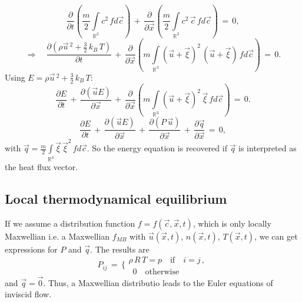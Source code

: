 \begin{equation}
  \frac{\partial{}}{\partial{t}} \left( \frac{m}{2} \int \limits_{\mathbb{R}^3} c^2 \, f d\vec c \right) \, + \, \frac{\partial{}}{\partial{\vec x}}  \left( \frac{m}{2} \int \limits_{\mathbb{R}^3} c^2 \, \vec c \, f d\vec c \right)  \, =\, 0,\nonumber
\end{equation}
\begin{equation}
  \Rightarrow \quad \frac{\partial{(\rho \vec u\,^2 + \frac{3}{2} \, k_B \, T)}}{\partial{t}}  \, + \, \frac{\partial{}}{\partial{\vec x}}  \left( m \int \limits_{\mathbb{R}^3} (\vec u + \vec \xi)^2 \,(\vec u + \vec \xi) \, f d\vec c \right)  \, =\, 0.\nonumber
\end{equation}
Using $E=\rho \vec u\,^2 + \frac{3}{2} \, k_B \, T$:
\begin{equation}
  \frac{\partial{E}}{\partial{t}}  \, + \, \frac{\partial{(\vec u E)}}{\partial{\vec x}} \, + \, \frac{\partial{}}{\partial{\vec x}}  \left( m \int \limits_{\mathbb{R}^3} (\vec u + \vec \xi)^2 \, \vec \xi \, f d\vec c \right)  \, =\, 0.\nonumber
\end{equation}
\begin{equation}
  \frac{\partial{E}}{\partial{t}}  \, + \, \frac{\partial{(\vec u E)}}{\partial{\vec x}} \, + \,  \frac{\partial{(P\, \vec u)}}{\partial{\vec x}} \, + \,  \frac{\partial{\vec q}}{\partial{\vec x}} \, =\, 0,\label{energy}
\end{equation}
with $\vec q = \frac{m}{2} \int \limits_{\mathbb{R}^3} \vec \xi\,\vec \xi^2 \, f d\vec c $. So the energy equation is recovered if $\vec q$ is interpreted as the heat flux vector.

\subsection{Local thermodynamical equilibrium}

If we assume a distribution function $f=f(\vec c, \vec x, t)$, which is only locally Maxwellian i.e. a Maxwellian $f_{MB}$ with $\vec u(\vec x, t)$, $n(\vec x, t)$, $T(\vec x, t)$, we can get expressions for $P$ and $\vec q $. The results are
\begin{equation}
  P_{ij}\,=\, \Bigg\{ \begin{array}{c}
		\rho\, R \, T = p \quad \mbox{if} \quad i=j\,,\\
		\,\,\, 0 \quad \mbox{otherwise }
	\end{array} \nonumber
\end{equation}
and $\vec q = \vec 0 $. Thus, a Maxwellian distributio leads to the Euler equations of inviscid flow.

